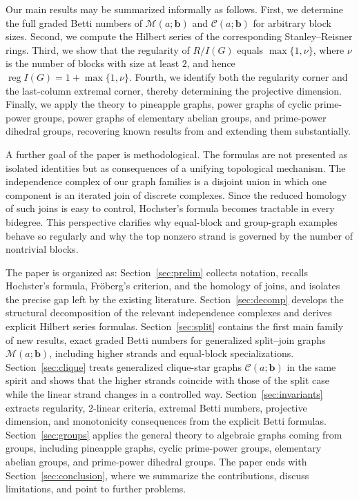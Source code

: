 \documentclass[12pt]{article}
\theoremstyle{definition}
\theoremstyle{remark}
\DeclareMathOperator{\reg}{reg}
\newcommand{\MM}{\mathcal{M}}
\newcommand{\CC}{\mathcal{C}}
\newcommand{\bk}[1]{\mathbf{#1}}
\begin{document}
	Our main results may be summarized informally as follows. First, we determine the full graded Betti numbers of $\MM(a;\bk{b})$ and $\CC(a;\bk{b})$ for arbitrary block sizes. Second, we compute the Hilbert series of the corresponding Stanley--Reisner rings. Third, we show that the regularity of $R/I(G)$ equals $\max\{1,\nu\}$, where $\nu$ is the number of blocks with size at least $2$, and hence $\reg I(G)=1+\max\{1,\nu\}$. Fourth, we identify both the regularity corner and the last-column extremal corner, thereby determining the projective dimension. Finally, we apply the theory to pineapple graphs, power graphs of cyclic prime-power groups, power graphs of elementary abelian groups, and prime-power dihedral groups, recovering known results from \cite{Rather2024,RatherWang2026} and extending them substantially.
	
	A further goal of the paper is methodological. The formulas are not presented as isolated identities but as consequences of a unifying topological mechanism. The independence complex of our graph families is a disjoint union in which one component is an iterated join of discrete complexes. Since the reduced homology of such joins is easy to control, Hochster's formula becomes tractable in every bidegree. This perspective clarifies why equal-block and group-graph examples behave so regularly and why the top nonzero strand is governed by the number of nontrivial blocks.
	
	\medskip
	
	The paper is organized as: Section~\ref{sec:prelim} collects notation, recalls Hochster's formula, Fröberg's criterion, and the homology of joins, and isolates the precise gap left by the existing literature. Section~\ref{sec:decomp} develops the structural decomposition of the relevant independence complexes and derives explicit Hilbert series formulas. Section~\ref{sec:split} contains the first main family of new results, exact graded Betti numbers for generalized split--join graphs $\MM(a;\bk{b})$, including higher strands and equal-block specializations. Section~\ref{sec:clique} treats generalized clique-star graphs $\CC(a;\bk{b})$ in the same spirit and shows that the higher strands coincide with those of the split case while the linear strand changes in a controlled way. Section~\ref{sec:invariants} extracts regularity, $2$-linear criteria, extremal Betti numbers, projective dimension, and monotonicity consequences from the explicit Betti formulas. Section~\ref{sec:groups} applies the general theory to algebraic graphs coming from groups, including pineapple graphs, cyclic prime-power groups, elementary abelian groups, and prime-power dihedral groups. The paper ends with Section~\ref{sec:conclusion}, where we summarize the contributions, discuss limitations, and point to further problems.
	
\end{document}
